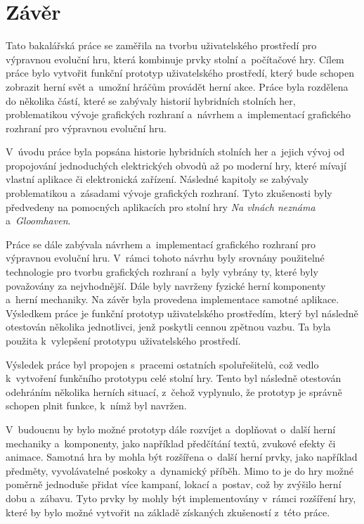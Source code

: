 \chapter{Závěr}
Tato bakalářská práce se zaměřila na tvorbu uživatelského prostředí pro výpravnou evoluční hru, která kombinuje prvky stolní a~počítačové hry. Cílem práce bylo vytvořit funkční prototyp uživatelského prostředí, který bude schopen zobrazit herní svět a~umožní hráčům provádět herní akce. Práce byla rozdělena do několika částí, které se zabývaly historií hybridních stolních her, problematikou vývoje grafických rozhraní a~návrhem a~implementací grafického rozhraní pro výpravnou evoluční hru.

V~úvodu práce byla popsána historie hybridních stolních her a~jejich vývoj od propojování jednoduchých elektrických obvodů až po moderní hry, které mívají vlastní aplikace či elektronická zařízení. Následné kapitoly se zabývaly problematikou a~zásadami vývoje grafických rozhraní. Tyto zkušenosti byly předvedeny na pomocných aplikacích pro stolní hry \textit{Na vlnách neznáma} a~\textit{Gloomhaven}.

Práce se dále zabývala návrhem a~implementací grafického rozhraní pro výpravnou evoluční hru. V~rámci tohoto návrhu byly srovnány použitelné technologie pro tvorbu grafických rozhraní a~byly vybrány ty, které byly považovány za nejvhodnější. Dále byly navrženy fyzické herní komponenty a~herní mechaniky. Na závěr byla provedena implementace samotné aplikace. Výsledkem práce je funkční prototyp uživatelského prostředím, který byl následně otestován několika jednotlivci, jenž poskytli cennou zpětnou vazbu. Ta byla použita k~vylepšení prototypu uživatelského prostředí.

Výsledek práce byl propojen s~pracemi ostatních spoluřešitelů, což vedlo k~vytvoření funkčního prototypu celé stolní hry. Tento byl následně otestován odehráním několika herních situací, z~čehož vyplynulo, že prototyp je správně schopen plnit funkce, k~nímž byl navržen.

V~budoucnu by bylo možné prototyp dále rozvíjet a~doplňovat o~další herní mechaniky a~komponenty, jako například předčítání textů, zvukové efekty či animace. Samotná hra by mohla být rozšířena o~další herní prvky, jako například předměty, vyvolávatelné poskoky a~dynamický příběh. Mimo to je do hry možné poměrně jednoduše přidat více kampaní, lokací a~postav, což by zvýšilo herní dobu a~zábavu. Tyto prvky by mohly být implementovány v~rámci rozšíření hry, které by bylo možné vytvořit na základě získaných zkušeností z~této práce.